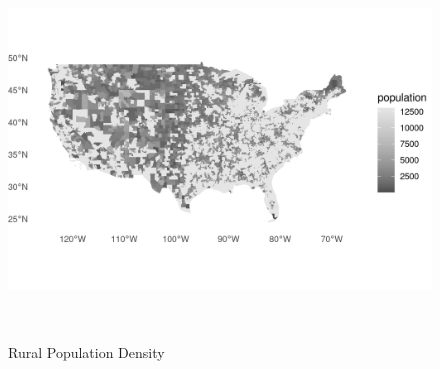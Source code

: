 \begin{figure}[htbp]
    \centering
     \includegraphics[width=1\textwidth, height=10cm]{plots/pop_map.png}
     \caption{Rural Population Density}
     \label{fig:pop_map}
 \end{figure}


